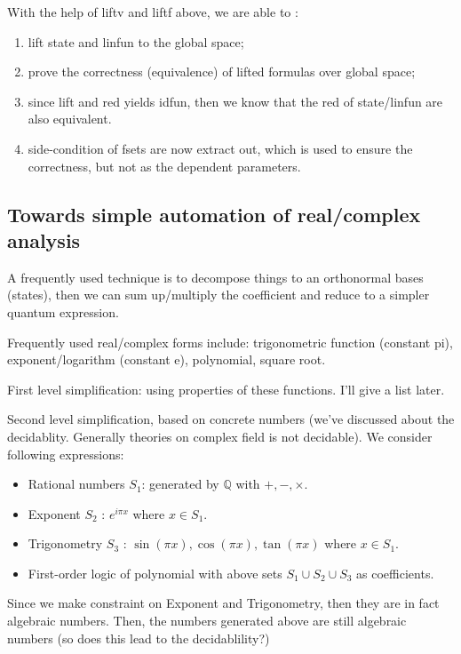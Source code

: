     With the help of liftv and liftf above, we are able to :
    \begin{enumerate}
        \item lift state and linfun to the global space;
        \item prove the correctness (equivalence) of lifted formulas over global space;
        \item since lift and red yields idfun, then we know that the red of state/linfun are also equivalent.
        \item side-condition of fsets are now extract out, which is used to ensure the correctness, but not as the dependent parameters.
    \end{enumerate}







    \subsection{Towards simple automation of real/complex analysis}
    
    A frequently used technique is to decompose things to an orthonormal bases (states), then we can sum up/multiply the coefficient and reduce to a simpler quantum expression.
    
    Frequently used real/complex forms include: trigonometric function (constant pi), exponent/logarithm (constant e), polynomial, square root.
    
    First level simplification: using properties of these functions. I'll give a list later.
    
    Second level simplification, based on concrete numbers (we've discussed about the decidablity. Generally theories on complex field is not decidable). We consider following expressions:
    \begin{itemize}
        \item Rational numbers $S_1$: generated by $\mathbb{Q}$ with $+, -, \times$.
        \item Exponent $S_2$ : $e^{i\pi x}$ where $x\in S_1$.
        \item Trigonometry $S_3$ : $\sin(\pi x), \cos(\pi x), \tan(\pi x)$ where $x\in S_1$.
        \item First-order logic of polynomial with above sets $S_1\cup S_2\cup S_3$ as coefficients.
    \end{itemize}
    Since we make constraint on Exponent and Trigonometry, then they are in fact algebraic numbers. Then, the numbers generated above are still algebraic numbers (so does this lead to the decidablility?)

